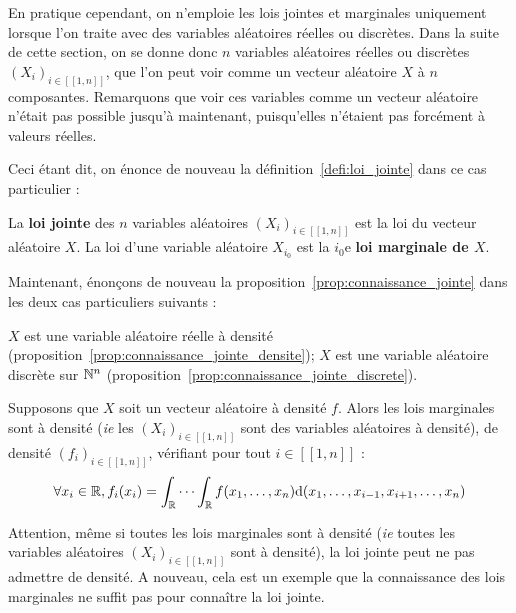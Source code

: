 \documentclass[../integ-proba.tex]{subfiles}
\begin{document}
    En pratique cependant, on n'emploie les lois jointes et marginales uniquement lorsque l'on traite avec des variables aléatoires réelles ou discrètes.
    Dans la suite de cette section, on se donne donc $n$ variables aléatoires réelles ou discrètes $\left( X_i \right)_{i \in [\![1, n]\!]}$, que l'on peut voir comme un vecteur aléatoire $X$ à $n$ composantes.
    Remarquons que voir ces variables comme un vecteur aléatoire n'était pas possible jusqu'à maintenant, puisqu'elles n'étaient pas forcément à valeurs réelles.

    Ceci étant dit, on énonce de nouveau la définition~\ref{defi:loi_jointe} dans ce cas particulier :

    \begin{defi}
        La \textbf{loi jointe} des $n$ variables aléatoires $\left( X_i \right)_{i \in [\![1, n]\!]}$ est la loi du vecteur aléatoire $X$.
        La loi d'une variable aléatoire $X_{i_0}$ est la $i_0$e \textbf{loi marginale de $X$}.
    \end{defi}

    Maintenant, énonçons de nouveau la proposition~\ref{prop:connaissance_jointe} dans les deux cas particuliers suivants :
    \begin{itemize}
        \itemb $X$ est une variable aléatoire réelle à densité (proposition~\ref{prop:connaissance_jointe_densite});
        \itemb $X$ est une variable aléatoire discrète sur $\mathbb{N}^n$ (proposition~\ref{prop:connaissance_jointe_discrete}).
    \end{itemize}

    \begin{prop}
        \label{prop:connaissance_jointe_densite}
        Supposons que $X$ soit un vecteur aléatoire à densité $f$.
        Alors les lois marginales sont à densité (\textit{ie} les $\left( X_i \right)_{i \in [\![1, n]\!]}$ sont des variables aléatoires à densité), de densité $\left(f_i\right)_{i \in [\![1, n]\!]}$, vérifiant pour tout $i \in [\![1, n]\!]$ :
        \begin{displaymath}
            \forall x_i \in \mathbb{R}, f_i(x_i) = \int_{\mathbb{R}} \cdots \int_{\mathbb{R}} f(x_1, \ldots, x_n) \textnormal{d} (x_1, \ldots, x_{i-1}, x_{i+1}, \ldots, x_n)
        \end{displaymath}
    \end{prop}

    \begin{rem}
        Attention, même si toutes les lois marginales sont à densité (\textit{ie} toutes les variables aléatoires $\left( X_i \right)_{i \in [\![1, n]\!]}$ sont à densité), la loi jointe peut ne pas admettre de densité.
        A nouveau, cela est un exemple que la connaissance des lois marginales ne suffit pas pour connaître la loi jointe.
    \end{rem}
\end{document}
